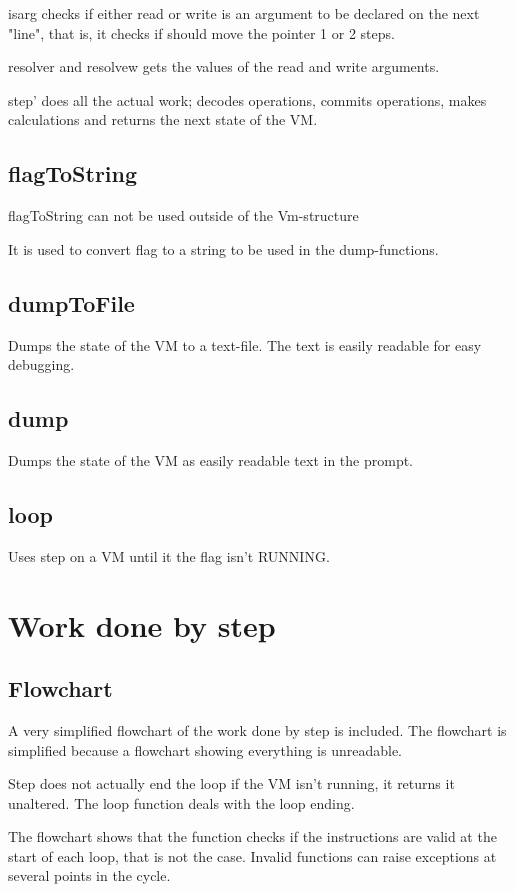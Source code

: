 isarg checks if either read or write is an argument to be declared on the next "line", that is, it checks if should move the pointer 1 or 2 steps. 

resolver and resolvew gets the values of the read and write arguments. 

step' does all the actual work; decodes operations, commits operations, makes calculations and returns the next state of the VM.

\subsection{flagToString}
flagToString can not be used outside of the Vm-structure

It is used to convert flag to a string to be used in the dump-functions.

\subsection{dumpToFile}
Dumps the state of the VM to a text-file. The text is easily readable for easy debugging.

\subsection{dump}
Dumps the state of the VM as easily readable text in the prompt.

\subsection{loop}
Uses step on a VM until it the flag isn't RUNNING.

\section{Work done by step}

\subsection{Flowchart}
A very simplified flowchart of the work done by step is included. The flowchart is simplified because a flowchart showing everything is unreadable.

Step does not actually end the loop if the VM isn't running, it returns it unaltered. The loop function deals with the loop ending.

The flowchart shows that the function checks if the instructions are valid at the start of each loop, that is not the case. Invalid functions can raise exceptions at several points in the cycle.

